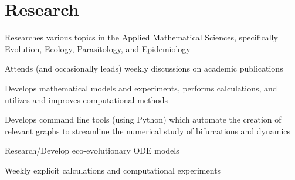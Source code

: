 \documentclass[letterpaper]{deedy-resume} %
\begin{document}
\begin{minipage}[t]{0.66\textwidth}
\section{Research}


\begin{tightitemize}
\item Researches various topics in the Applied Mathematical Sciences, specifically Evolution, Ecology, Parasitology, and Epidemiology
\item Attends (and occasionally leads) weekly discussions on academic publications
\item Develops mathematical models and experiments, performs calculations, and utilizes and improves computational methods
\item Develops command line tools (using Python) which automate the creation of relevant graphs to streamline the numerical study of bifurcations and dynamics
\end{tightitemize}
\vspace{4pt}


\begin{tightitemize}
\item Research/Develop eco-evolutionary ODE models
\item Weekly explicit calculations and computational experiments
\end{tightitemize}






\end{minipage}
\end{document}
